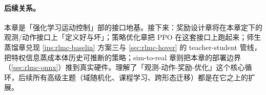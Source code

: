 \paragraph{后续关系。}本章是「强化学习运动控制」部的接口地基。接下来：奖励设计章将在本章定下的观测/动作接口上「定义好与坏」；策略优化章把 PPO 在这套接口上跑起来；师生蒸馏章兑现 \cref{ins:rlmc-baselin} 方案三与 \cref{sec:rlmc-hover} 的 teacher-student 管线，把特权信息蒸成本体历史可推断的策略；sim-to-real 章则把本章的部署边界（\cref{sec:rlmc-onnx}）推到真实硬件。理解了「观测-动作-奖励-优化」这个核心循环，后续所有高级主题（域随机化、课程学习、跨形态迁移）都是在它之上的扩展。
